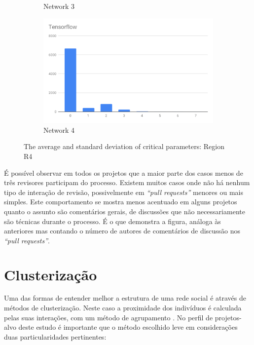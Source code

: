 \documentclass[12pt,openany,oneside,a4paper,english,brazil]{abntbibufjf}
\begin{document}
\begin{figure}
\begin{subfigure}[b]{0.475\textwidth}
         \caption[]%
         {{\small Network 3}}
         \label{fig:mean and std of net34}
     \end{subfigure}
     \quad
     \begin{subfigure}[b]{0.475\textwidth}
         \centering
         \includegraphics[width=\textwidth]{resultados/dist-rc-tensorflow}
         \caption[]%
         {{\small Network 4}}
         \label{fig:mean and std of net44}
     \end{subfigure}
     \caption[ The average and standard deviation of critical parameters ]
     {\small The average and standard deviation of critical parameters: Region R4}
     \label{fig:mean and std of nets}
 \end{figure}

  É possível observar em todos os projetos que a maior parte dos casos menos de três revisores participam do processo. Existem muitos casos onde não há nenhum tipo de interação de revisão, possivelmente em \textit{``pull requests''} menores ou mais simples. Este comportamento se mostra menos acentuado em alguns projetos quanto o assunto são comentários gerais, de discussões que não necessariamente são técnicas durante o processo. É o que demonstra a figura, análoga às anteriores mas contando o número de autores de comentários de discussão nos \textit{``pull requests''}.

\section{Clusterização}

  Uma das formas de entender melhor a estrutura de uma rede social é através de métodos de clusterização.  Neste caso a proximidade dos indivíduos é calculada pelas suas interações, com um método de agrupamento \cite{meng2014}. No perfil de projetos-alvo deste estudo é importante que o método escolhido leve em considerações duas particularidades pertinentes:
\end{document}
